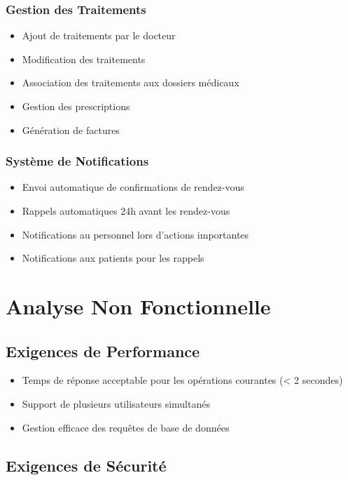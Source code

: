 \documentclass[12pt,a4paper]{report}
\begin{document}
\subsubsection{Gestion des Traitements}

\begin{itemize}
    \item Ajout de traitements par le docteur
    \item Modification des traitements
    \item Association des traitements aux dossiers médicaux
    \item Gestion des prescriptions
    \item Génération de factures
\end{itemize}

\subsubsection{Système de Notifications}

\begin{itemize}
    \item Envoi automatique de confirmations de rendez-vous
    \item Rappels automatiques 24h avant les rendez-vous
    \item Notifications au personnel lors d'actions importantes
    \item Notifications aux patients pour les rappels
\end{itemize}

\section{Analyse Non Fonctionnelle}

\subsection{Exigences de Performance}

\begin{itemize}
    \item Temps de réponse acceptable pour les opérations courantes (< 2 secondes)
    \item Support de plusieurs utilisateurs simultanés
    \item Gestion efficace des requêtes de base de données
\end{itemize}

\subsection{Exigences de Sécurité}
\end{document}
